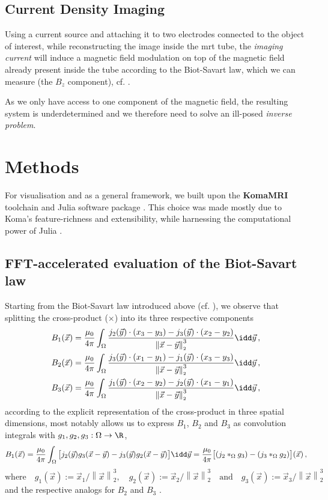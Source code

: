 \documentclass[10pt]{article}
\newcommand{\sfrac}[2]{{#1 / #2}}
\renewcommand{\norm}[1]{\left\lVert#1\right\rVert_{\scriptscriptstyle 2}}
\begin{document}
  \subsection{Current Density Imaging}
  Using a current source and attaching it to two electrodes connected to the object of interest, while reconstructing the image inside the \gls{mrt} tube, the \textit{imaging current} will induce a magnetic field modulation on top of the magnetic field already present inside the tube according to the Biot-Savart law, which we can measure (the $B_z$ component), cf. \cite{2004-mrcdi-from-one-var}.

  As we only have access to one component of the magnetic field, the resulting system is underdetermined and we therefore need to solve an ill-posed \textit{inverse problem}.

  \section{Methods}
  For visualisation and as a general framework, we built upon the \textbf{KomaMRI} toolchain and Julia software package \parencite{2022-koma-mri}.
  This choice was made mostly due to Koma's feature-richness and extensibility, while harnessing the computational power of Julia \parencite{2017-julia}.

  \subsection{FFT-accelerated evaluation of the Biot-Savart law}
  \label{sec:fft-biot}
  Starting from the Biot-Savart law introduced above (cf. ), we observe that splitting the cross-product ($\times$) into its three respective components
  \begin{align*}
    B_1(\vec{x}) & = \frac{\mu_0}{4\pi} \int_{\Omega} \frac{j_2(\vec{y}) \cdot (x_3 - y_3) - j_3(\vec{y}) \cdot (x_2 - y_2)}{\norm{\vec{x} - \vec{y}}^3} \idd\vec{y} \,, \\
    B_2(\vec{x}) & = \frac{\mu_0}{4\pi} \int_{\Omega} \frac{j_3(\vec{y}) \cdot (x_1 - y_1) - j_1(\vec{y}) \cdot (x_3 - y_3)}{\norm{\vec{x} - \vec{y}}^3} \idd\vec{y} \,, \\
    B_3(\vec{x}) & = \frac{\mu_0}{4\pi} \int_{\Omega} \frac{j_1(\vec{y}) \cdot (x_2 - y_2) - j_2(\vec{y}) \cdot (x_1 - y_1)}{\norm{\vec{x} - \vec{y}}^3} \idd\vec{y} \,,
  \end{align*}
  according to the explicit representation of the cross-product in three spatial dimensions, most notably allows us to express $B_1$, $B_2$ and $B_3$ as convolution integrals with $g_1, g_2, g_3: \Omega \to \R$,
  $$B_1(\vec{x}) = \frac{\mu_0}{4\pi} \int_{\Omega} \big[j_2(\vec{y}) g_3(\vec{x} - \vec{y}) - j_3(\vec{y}) g_2(\vec{x} - \vec{y})\big]\idd\vec{y} = \frac{\mu_0}{4\pi} \big[(j_2 *_{\Omega} g_3) - (j_3 *_{\Omega} g_2)\big](\vec{x})\,,$$
  $$\text{where}\quad g_1(\vec{x}) := \sfrac{\vec{x}_1}{\norm{\vec{x}}^3}, \quad g_2(\vec{x}) := \sfrac{\vec{x}_2}{\norm{\vec{x}}^3} \quad\text{and}\quad g_3(\vec{x}) := \sfrac{\vec{x}_3}{\norm{\vec{x}}^3}$$
  and the respective analogs for $B_2$ and $B_3$ \parencite{2020-biot-savart-evaluation-fft}.
\end{document}

